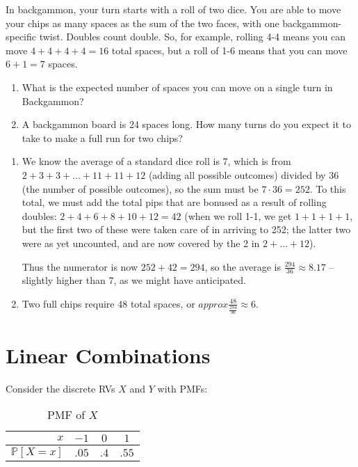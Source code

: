 \documentclass{article}
\newenvironment{solution}{\color{red}}{\color{black}}
\begin{document}
In backgammon, your turn starts with a roll of two dice. You are able to move your chips as many spaces as the sum of the two faces, with one backgammon-specific twist. Doubles count double. So, for example, rolling 4-4 means you can move $4+4+4+4=16$ total spaces, but a roll of 1-6 means that you can move $6+1=7$ spaces.

\begin{enumerate}
\item What is the expected number of spaces you can move on a single turn in Backgammon?
\item A backgammon board is 24 spaces long. How many turns do you expect it to take to make a full run for two chips?
\end{enumerate}

\begin{solution}
\begin{enumerate}
\item We know the average of a standard dice roll is 7, which is from $2 + 3 + 3 + \ldots + 11 + 11 + 12$ (adding all possible outcomes) divided by 36 (the number of possible outcomes), so the sum must be $7\cdot 36 = 252$. To this total, we must add the total pips that are bonused as a result of rolling doubles: $2 + 4 + 6 + 8 + 10 + 12 = 42$ (when we roll 1-1, we get $1+1+1+1$, but the first two of these were taken care of in arriving to 252; the latter two were as yet uncounted, and are now covered by the 2 in $2+\ldots+12$).

Thus the numerator is now $252 + 42 = 294$, so the average is $\frac{294}{36}\approx 8.17$ -- slightly higher than 7, as we might have anticipated.

\item Two full chips require 48 total spaces, or $approx \frac{48}{\frac{294}{36}} \approx 6$.
\end{enumerate}
\end{solution}

\section{Linear Combinations}

Consider the discrete RVs $X$ and $Y$ with PMFs:

\begin{table}[htbp]
\centering
\begin{tabular}{r|ccc}
$x$ & $-1$ & $0$ & $1$ \\
\hline
$\mathbb{P}[X = x]$ & $.05$ & $.4$ & $.55$ \\
\end{tabular}
\caption{PMF of $X$}
\label{tbl:x_dist}
\end{table}
\end{document}
